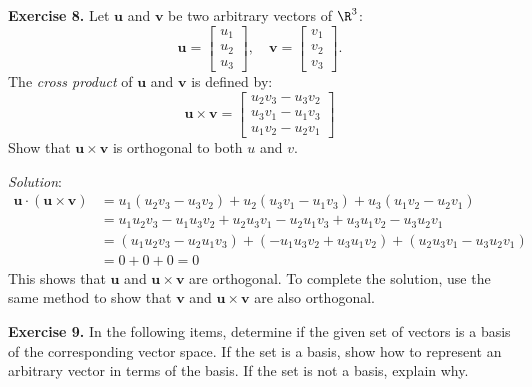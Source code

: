 \documentclass[12pt]{article}
\begin{document}
\textbf{Exercise 8.} Let $\mathbf{u}$ and $\mathbf{v}$ be two arbitrary vectors of $\R^3$:
\[
\mathbf{u}=\begin{bmatrix} u_1\\u_2\\u_3 \end{bmatrix}, \quad
\mathbf{v}=\begin{bmatrix} v_1\\v_2\\v_3 \end{bmatrix}.
\]
The \emph{cross product} of $\mathbf{u}$ and $\mathbf{v}$ is defined by:
\[
\mathbf{u}\times\mathbf{v} =
\begin{bmatrix}u_2v_3-u_3v_2 \\ u_3v_1-u_1v_3\\ u_1v_2-u_2v_1\end{bmatrix}
\]
Show that $\mathbf{u}\times\mathbf{v}$ is orthogonal to both $u$ and $v$.

\emph{Solution}:
\begin{align*}
\mathbf{u}\cdot (\mathbf{u}\times\mathbf{v}) &= 
u_1(u_2v_3-u_3v_2)+u_2(u_3v_1-u_1v_3)+u_3(u_1v_2-u_2v_1)\\
&=
u_1u_2v_3-u_1u_3v_2 + u_2u_3v_1 - u_2u_1v_3 + u_3u_1v_2-u_3u_2v_1\\
&=(u_1u_2v_3-u_2u_1v_3) + (-u_1u_3v_2+ u_3u_1v_2) + (u_2u_3v_1-u_3u_2v_1)\\
&=0+0+0=0
\end{align*}
This shows that $\mathbf{u}$ and $\mathbf{u}\times\mathbf{v}$ are orthogonal. To complete the solution, use the same method to show that $\mathbf{v}$ and $\mathbf{u}\times\mathbf{v}$ are also orthogonal.
\proofend

\textbf{Exercise 9.} In the following items, determine if the given set of vectors is a basis of the corresponding vector space. If the set is a basis, show how to represent an arbitrary vector in terms of the basis. If the set is not a basis, explain why.
\end{document}
